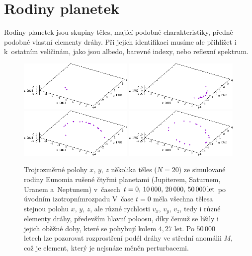 \documentclass[A4paper, 12pt, oneside]{book}
\begin{document}
\pagebreak
\section{Rodiny planetek}

Rodiny planetek jsou skupiny těles, mající podobné charakteristiky, předně podobné vlastní elementy dráhy. Při jejich identifikaci musíme ale přihlížet i k~ostatním veličinám, jako jsou albedo, barevné indexy, nebo reflexní spektrum.

\immediate{}
\immediate{}
\immediate{}
\immediate{}
\begin{figure}
	\centering
	\includegraphics[width=0.49\textwidth]{obr/trajec_001t.png}
	\includegraphics[width=0.49\textwidth]{obr/trajec_101t.png} \\
	\includegraphics[width=0.49\textwidth]{obr/trajec_201t.png}
	\includegraphics[width=0.49\textwidth]{obr/trajec_501t.png}
	\caption{Trojrozměrné polohy $x,\,y,\,z$ několika těles ($N=20$) ze simulované rodiny Eunomia rušené čtyřmi planetami (Jupiterem, Saturnem, Uranem a~Neptunem) v~časech $t=0,\,10\,000,\,20\,000,\,50\,000\,{\rm let}$ po úvodním izotropním\protect\footnotemark rozpadu V~čase $t=0$ měla všechna tělesa stejnou polohu $x,\,y,\,z$, ale různé rychlosti $v_x,\,v_y,\,v_z$, tedy i různé elementy dráhy, především hlavní poloosu, díky čemuž se lišily i jejich oběžné doby, které se pohybují kolem $4,27$ let. Po $50\,000$ letech lze pozorovat rozprostření podél dráhy ve střední anomálii $M$, což je element, který je nejsnáze měněn perturbacemi.} \label{fig:trajec}
\end{figure}
\end{document}
